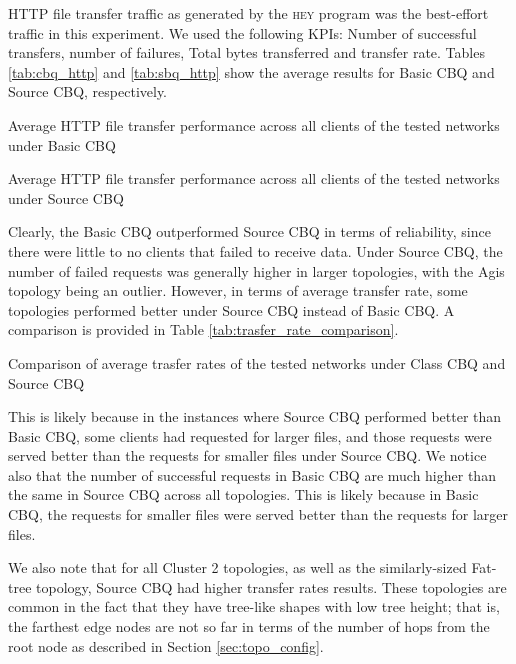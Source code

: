 HTTP file transfer traffic as generated by the \textsc{hey} program was the best-effort traffic in this experiment. We used the following KPIs: Number of successful transfers, number of failures, Total bytes transferred and transfer rate. Tables \ref{tab:cbq_http} and \ref{tab:sbq_http} show the average results for Basic CBQ and Source CBQ, respectively.

\begin{table}[htbp]
    \caption{Average HTTP file transfer performance across all clients of the tested networks under Basic CBQ}
    \centering
    
    \label{tab:cbq_http}
\end{table}

\begin{table}[htbp]
    \caption{Average HTTP file transfer performance across all clients of the tested networks under Source CBQ}
    \centering
    
    \label{tab:sbq_http}
\end{table}

Clearly, the Basic CBQ outperformed Source CBQ in terms of reliability, since there were little to no clients that failed to receive data. Under Source CBQ, the number of failed requests was generally higher in larger topologies, with the Agis topology being an outlier. However, in terms of average transfer rate, some topologies performed better under Source CBQ instead of Basic CBQ. A comparison is provided in Table \ref{tab:trasfer_rate_comparison}.

\begin{table}[htbp]
    \caption{Comparison of average trasfer rates of the tested networks under Class CBQ and Source CBQ}
    \centering
    
    \label{tab:trasfer_rate_comparison}
\end{table}

This is likely because in the instances where Source CBQ performed better than Basic CBQ, some clients had requested for larger files, and those requests were served better than the requests for smaller files under Source CBQ. We notice also that the number of successful requests in Basic CBQ are much higher than the same in Source CBQ across all topologies. This is likely because in Basic CBQ, the requests for smaller files were served better than the requests for larger files.

We also note that for all Cluster 2 topologies, as well as the similarly-sized Fat-tree topology, Source CBQ had higher transfer rates results. These topologies are common in the fact that they have tree-like shapes with low tree height; that is, the farthest edge nodes are not so far in terms of the number of hops from the root node as described in Section \ref{sec:topo_config}.

